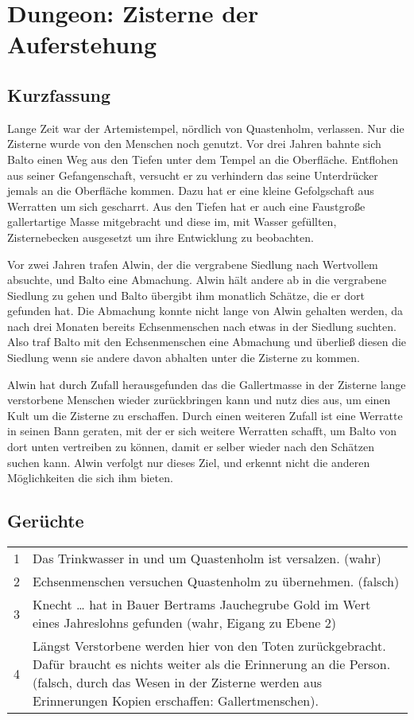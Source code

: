 \section{Dungeon: Zisterne der Auferstehung}

\subsection{Kurzfassung}

Lange Zeit war der Artemistempel, nördlich von Quastenholm, verlassen. Nur die
Zisterne wurde von den Menschen noch genutzt. Vor drei Jahren bahnte sich Balto
einen Weg aus den Tiefen unter dem Tempel an die Oberfläche. Entflohen aus
seiner Gefangenschaft, versucht er zu verhindern das seine Unterdrücker jemals
an die Oberfläche kommen. Dazu hat er eine kleine Gefolgschaft aus
Werratten um sich gescharrt. Aus den Tiefen hat er auch eine Faustgroße
gallertartige Masse mitgebracht und diese im, mit Wasser gefüllten,
Zisternebecken ausgesetzt um ihre Entwicklung zu beobachten.

Vor zwei Jahren trafen Alwin, der die vergrabene Siedlung nach Wertvollem
absuchte, und Balto eine Abmachung. Alwin hält andere ab in die vergrabene
Siedlung zu gehen und Balto übergibt ihm monatlich Schätze, die er dort
gefunden hat. Die Abmachung konnte nicht lange von Alwin gehalten werden, da
nach drei Monaten bereits Echsenmenschen nach etwas in der Siedlung suchten. Also
traf Balto mit den Echsenmenschen eine Abmachung und überließ diesen die
Siedlung wenn sie andere davon abhalten unter die Zisterne zu kommen.

Alwin hat durch Zufall herausgefunden das die Gallertmasse in der
Zisterne lange verstorbene Menschen wieder zurückbringen kann und
nutz dies aus, um einen Kult um die Zisterne zu erschaffen. Durch
einen weiteren Zufall ist eine Werratte in seinen Bann geraten, mit
der er sich weitere Werratten schafft, um Balto von dort unten
vertreiben zu können, damit er selber wieder nach den Schätzen suchen
kann. Alwin verfolgt nur dieses Ziel, und erkennt nicht die
anderen Möglichkeiten die sich ihm bieten.

\subsection{Gerüchte}

\begin{tabularx}{\columnwidth}{cZ}
1 & Das Trinkwasser in und um Quastenholm ist versalzen. (wahr) \\
2 & Echsenmenschen versuchen Quastenholm zu übernehmen. (falsch) \\
3 & Knecht … hat in Bauer Bertrams Jauchegrube Gold im Wert eines
    Jahreslohns gefunden (wahr, Eigang zu Ebene 2) \\
4 & Längst Verstorbene werden hier von den Toten zurückgebracht.
    Dafür braucht es nichts weiter als die Erinnerung an die Person.
    (falsch, durch das Wesen in der Zisterne werden aus Erinnerungen Kopien 
    erschaffen: Gallertmenschen). \\
\end{tabularx}

